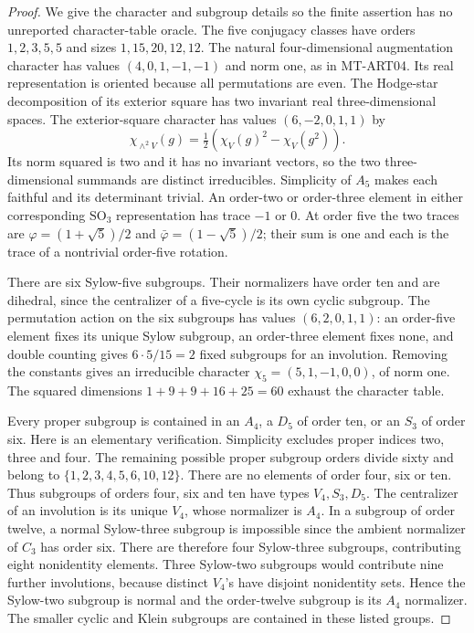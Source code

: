 \begin{proof}
We give the character and subgroup details so the finite assertion has
no unreported character-table oracle. The five conjugacy classes have
orders $1,2,3,5,5$ and sizes $1,15,20,12,12$. The natural four-dimensional
augmentation character has values $(4,0,1,-1,-1)$ and norm one, as in
MT-ART04. Its real representation is oriented because all permutations
are even. The Hodge-star decomposition of its exterior square has two
invariant real three-dimensional spaces. The exterior-square character
has values $(6,-2,0,1,1)$ by
\[
 \chi_{\wedge^2 V}(g)=\tfrac12(\chi_V(g)^2-\chi_V(g^2)).
\]
Its norm squared is two and it has no invariant vectors, so the two
three-dimensional summands are distinct irreducibles. Simplicity of
$A_5$ makes each faithful and its determinant trivial. An order-two or
order-three element in either corresponding $\mathrm{SO}_3$ representation
has trace $-1$ or $0$. At order five the two traces are
$\varphi=(1+\sqrt5)/2$ and $\bar\varphi=(1-\sqrt5)/2$; their sum is
one and each is the trace of a nontrivial order-five rotation.

There are six Sylow-five subgroups. Their normalizers have order ten
and are dihedral, since the centralizer of a five-cycle is its own
cyclic subgroup. The permutation action on the six subgroups has
values $(6,2,0,1,1)$: an order-five element fixes its unique Sylow
subgroup, an order-three element fixes none, and double counting gives
$6\cdot5/15=2$ fixed subgroups for an involution. Removing the constants
gives an irreducible character $\chi_5=(5,1,-1,0,0)$, of norm one.
The squared dimensions $1+9+9+16+25=60$ exhaust the character table.

Every proper subgroup is contained in an $A_4$, a $D_5$ of order ten,
or an $S_3$ of order six. Here is an elementary verification. Simplicity
excludes proper indices two, three and four. The remaining possible
proper subgroup orders divide sixty and belong to
$\{1,2,3,4,5,6,10,12\}$. There are no elements of order four, six or
ten. Thus subgroups of orders four, six and ten have types
$V_4,S_3,D_5$. The centralizer of an involution is its unique $V_4$,
whose normalizer is $A_4$. In a subgroup of order twelve, a normal
Sylow-three subgroup is impossible since the ambient normalizer of
$C_3$ has order six. There are therefore four Sylow-three subgroups,
contributing eight nonidentity elements. Three Sylow-two subgroups
would contribute nine further involutions, because distinct $V_4$'s
have disjoint nonidentity sets. Hence the Sylow-two subgroup is normal
and the order-twelve subgroup is its $A_4$ normalizer. The smaller
cyclic and Klein subgroups are contained in these listed groups.


\end{proof}
